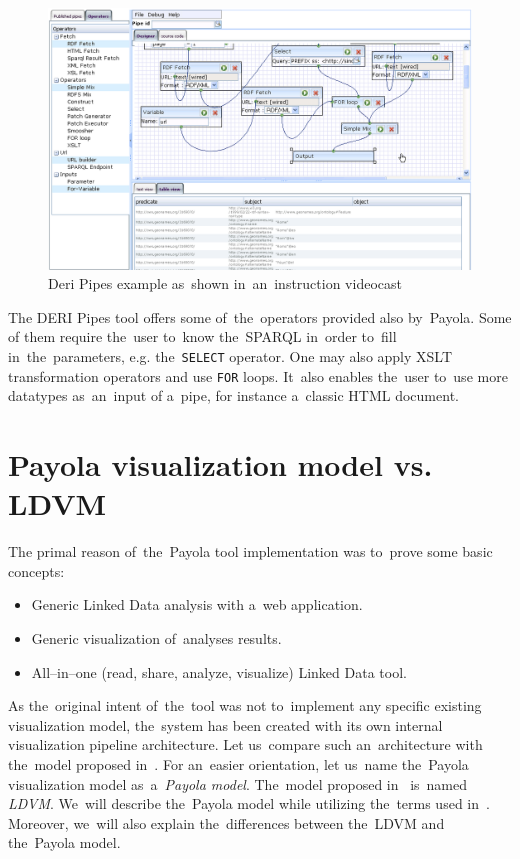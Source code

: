 \begin{figure}
	\centering
	\includegraphics[width=140mm]{img/deri.png}
	\caption{Deri Pipes example as~shown in~an~instruction videocast~\cite{deri-screen-source}}
	\label{fig:deri}
\end{figure}

The DERI Pipes tool offers some of~the~operators provided also by~Payola. Some 
of them require the~user to~know the~SPARQL in~order to~fill in~the~parameters, e.g. the~\texttt{SELECT} operator. One may also apply XSLT 
transformation operators and use \texttt{FOR} loops. It~also enables the~user to~use more datatypes as~an~input 
of a~pipe, for instance a~classic HTML document.

\section{Payola visualization model vs. LDVM}
\label{sec:rw:ldvm}
The primal reason of~the~Payola tool implementation was to~prove some basic concepts:

\begin{itemize}
\item Generic Linked Data analysis with a~web application.
\item Generic visualization of~analyses results.
\item All--in--one (read, share, analyze, visualize) Linked Data tool.
\end{itemize}

As the~original intent of~the~tool was not to~implement any specific existing visualization model,
the~system has been created with its own internal visualization pipeline architecture. Let us~compare such
an~architecture with the~model proposed in~\cite{ldvm}. For an~easier orientation, let us~name the~Payola visualization 
model as~a~\emph{Payola model}. The~model proposed in~\cite{ldvm} is~named \emph{LDVM}. We~will describe the~Payola
model while utilizing the~terms used in~\cite{ldvm}. Moreover, we~will also explain
the~differences between the~LDVM and the~Payola model.

